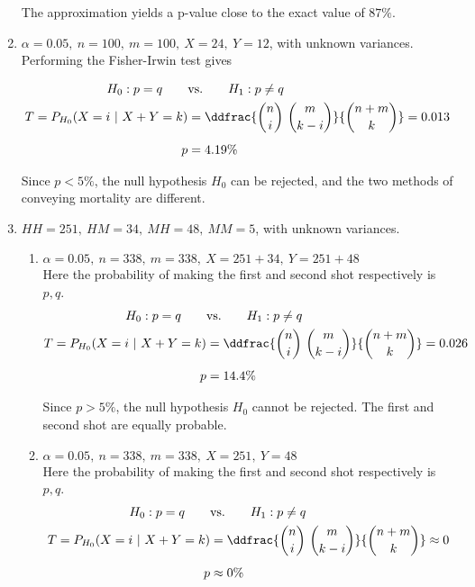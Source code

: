 \begin{enumerate}
	The approximation yields a p-value close to the exact value of $ 87\% $.
	
	\item $\alpha = 0.05,\ n = 100,\ m = 100,\ X = 24,\ Y = 12$, with unknown variances. Performing the Fisher-Irwin test gives
	
	\begin{align}
		H_0 : p  = q \qquad &\text{vs.} \qquad H_1 : p  \neq q \nonumber \\
		T = P_{H_0}(X = i\ |\ X+Y = k) &= \ddfrac{\binom{n}{i}\ \binom{m}{k-i}}{\binom{n+m}{k}} = 0.013 \nonumber \\[1ex]
		p &= 4.19\%
	\end{align}
		
	Since $ p < 5\% $, the null hypothesis $ H_0 $ can be rejected, and the two methods of conveying mortality are different.
	
	\item $HH = 251,\ HM = 34,\ MH = 48,\ MM = 5$, with unknown variances.
	
	\begin{enumerate}
		
		\item $\alpha = 0.05,\ n = 338,\ m = 338,\ X = 251+34,\ Y = 251+48$\\
		Here the probability of making the first and second shot respectively is $ p, q $.
		\begin{align}
			H_0 : p = q \qquad &\text{vs.} \qquad H_1 : p  \neq q \nonumber \\
			T = P_{H_0}(X = i\ |\ X+Y = k) &= \ddfrac{\binom{n}{i}\ \binom{m}{k-i}}{\binom{n+m}{k}} = 0.026 \nonumber \\[1ex]
			p &= 14.4\%
		\end{align}
		
		Since $ p > 5\% $, the null hypothesis $ H_0 $ cannot be rejected. The first and second shot are equally probable.


		\item $\alpha = 0.05,\ n = 338,\ m = 338,\ X = 251,\ Y = 48$\\
		Here the probability of making the first and second shot respectively is $ p, q $.
		\begin{align}
			H_0 : p = q \qquad &\text{vs.} \qquad H_1 : p  \neq q \nonumber \\
			T = P_{H_0}(X = i\ |\ X+Y = k) &= \ddfrac{\binom{n}{i}\ \binom{m}{k-i}}{\binom{n+m}{k}} \approx 0 \nonumber \\[1ex]
			p &\approx 0\%
		\end{align}
		

\end{enumerate}
\end{enumerate}
